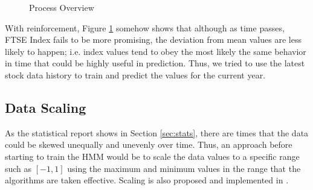 \documentclass{acm_proc_article-sp}
\begin{document}
\begin{figure}[h]
\centering
\setlength\fboxsep{0.1pt}
\setlength\fboxrule{0.7pt}
\caption{Process Overview} \label{fig:ftse-std}
\end{figure}

With reinforcement, Figure \ref{fig:ftse-std} somehow shows that although as time passes, FTSE Index fails to be more
promising, the deviation from mean values are less likely to happen; i.e. index values tend to obey the most likely the
same behavior in time that could be highly useful in prediction. Thus, we tried to use the latest stock data history to
train and predict the values for the current year.

\subsection{Data Scaling} \label{sec:scale}
As the statistical report shows in Section \ref{sec:stats}, there are times that the data could be skewed unequally and
unevenly over time. Thus, an approach before starting to train the HMM would be to scale the data values to a specific
range such as $[-1, 1]$ using the maximum and minimum values in the range that the algorithms are taken effective.
Scaling is also proposed and implemented in \cite{hassan:hmm_stock_fuzzy}.
\end{document}
